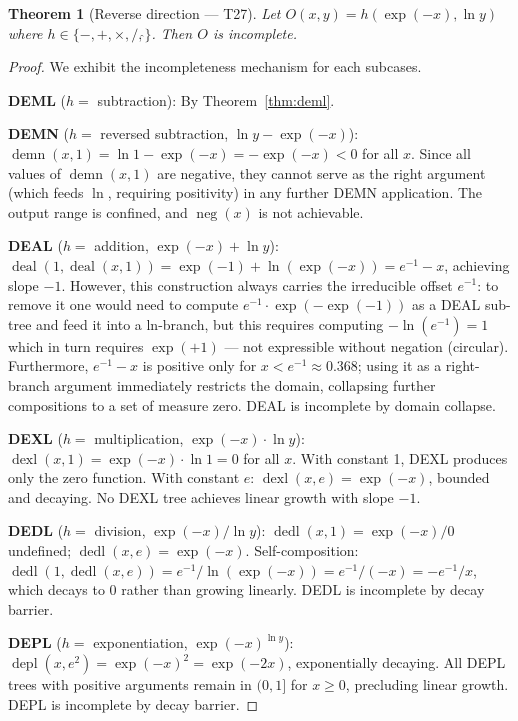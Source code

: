 \documentclass[12pt,a4paper]{article}
\newtheorem{theorem}{Theorem}[section]
\theoremstyle{definition}
\begin{document}
\begin{theorem}[Reverse direction — T27]\label{thm:reverse}
Let $O(x,y)=h(\exp(-x),\ln y)$ where $h\in\{-,+,\times,/,\hat{}\}$.
Then $O$ is incomplete.
\end{theorem}
\begin{proof}
We exhibit the incompleteness mechanism for each subcases.

\noindent\textbf{DEML} ($h=$ subtraction): By Theorem~\ref{thm:deml}.

\noindent\textbf{DEMN} ($h=$ reversed subtraction, $\ln y - \exp(-x)$):
$\operatorname{demn}(x,1) = \ln 1 - \exp(-x) = -\exp(-x) < 0$ for all $x$.
Since all values of $\operatorname{demn}(x,1)$ are negative, they cannot serve
as the right argument (which feeds $\ln$, requiring positivity) in any
further DEMN application. The output range is confined, and $\operatorname{neg}(x)$
is not achievable.

\noindent\textbf{DEAL} ($h=$ addition, $\exp(-x)+\ln y$):
$\operatorname{deal}(1,\operatorname{deal}(x,1)) = \exp(-1)+\ln(\exp(-x))=e^{-1}-x$,
achieving slope $-1$. However, this construction always carries the
irreducible offset $e^{-1}$: to remove it one would need to compute
$e^{-1}\cdot\exp(-\exp(-1))$ as a DEAL sub-tree and feed it into a
ln-branch, but this requires computing $-\ln(e^{-1})=1$ which in turn
requires $\exp(+1)$ — not expressible without negation (circular).
Furthermore, $e^{-1}-x$ is positive only for $x<e^{-1}\approx 0.368$;
using it as a right-branch argument immediately restricts the domain,
collapsing further compositions to a set of measure zero. DEAL is
incomplete by domain collapse.

\noindent\textbf{DEXL} ($h=$ multiplication, $\exp(-x)\cdot\ln y$):
$\operatorname{dexl}(x,1)=\exp(-x)\cdot\ln 1=0$ for all $x$. With constant 1, DEXL
produces only the zero function. With constant $e$: $\operatorname{dexl}(x,e)=\exp(-x)$,
bounded and decaying. No DEXL tree achieves linear growth with slope $-1$.

\noindent\textbf{DEDL} ($h=$ division, $\exp(-x)/\ln y$):
$\operatorname{dedl}(x,1)=\exp(-x)/0$ undefined; $\operatorname{dedl}(x,e)=\exp(-x)$.
Self-composition: $\operatorname{dedl}(1,\operatorname{dedl}(x,e))=e^{-1}/\ln(\exp(-x))=e^{-1}/(-x)
=-e^{-1}/x$, which decays to 0 rather than growing linearly. DEDL is
incomplete by decay barrier.

\noindent\textbf{DEPL} ($h=$ exponentiation, $\exp(-x)^{\ln y}$):
$\operatorname{depl}(x,e^2)=\exp(-x)^2=\exp(-2x)$, exponentially decaying.
All DEPL trees with positive arguments remain in $(0,1]$ for $x\geq 0$,
precluding linear growth. DEPL is incomplete by decay barrier.
\end{proof}
\end{document}
